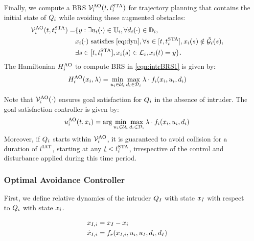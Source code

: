 Finally, we compute a BRS $\mathcal{V}^{\text{AO}}_{i}(t, t^\text{STA}_i)$ for trajectory planning that contains the initial state of $Q_i$ while avoiding these augmented obstacles:
\begin{equation} \label{eqn:intrBRS1}
\begin{aligned}
\brs^{\text{AO}}_{i}(t, \sta_i) = & \{y: \exists \ctrl_i(\cdot) \in \cfset_i, \forall \dstb_i(\cdot) \in \dfset_i, \\
& \state_i(\cdot) \text{ satisfies \eqref{eq:dyn}}, \forall s \in [t, \sta_i], \state_i(s) \notin \tilde\obsset_i(s), \\
& \exists s \in [t, \sta_i], \state_i(s) \in \targetset_i, \state_i(t) = y \}.
\end{aligned}
\end{equation}
The Hamiltonian $H^{\text{AO}}_{i}$ to compute BRS in \eqref{eqn:intrBRS1} is given by:
\begin{equation} \label{eqn:BRSham}
\ham^{\text{AO}}_{i}(\state_i, \costate) = \min_{\ctrl_i \in \cset_i} \max_{\dstb_i \in \dset_i} \costate \cdot f_i (\state_i, \ctrl_i, \dstb_i)
\end{equation}

Note that $\mathcal{V}^{\text{AO}}_{i}(\cdot)$ ensures goal satisfaction for $Q_i$ in the absence of intruder. The goal satisfaction controller is given by:
\begin{equation}
{u^{\text{AO}}_{i}}(t, x_i) = \arg \min_{u_i \in \mathcal{U}_i} \max_{d_i \in \mathcal{D}_i} \lambda \cdot f_i (x_i, u_i, d_i)
\end{equation}
Moreover, if $Q_i$ starts within $\mathcal{V}^{\text{AO}}_{i}$, it is guaranteed to avoid collision for a duration of $t^\text{IAT}$, starting at any $\underline{t} < t^\text{STA}_i$, irrespective of the control and disturbance applied during this time period. 

\subsubsection{Optimal Avoidance Controller} \label{sec:intruder_avoid}
First, we define relative dynamics of the intruder $Q_{I}$ with state $x_I$ with respect to $Q_i$ with state $x_i$.

\begin{equation}
\label{eq:reldyn}
\begin{aligned}
\state_{\intr, i} &= \state_\intr - \state_i \\
\dot \state_{\intr, i} &= f_r(\state_{\intr, i}, \ctrl_i, \ctrl_\intr, \dstb_i, \dstb_\intr)
\end{aligned}
\end{equation}

